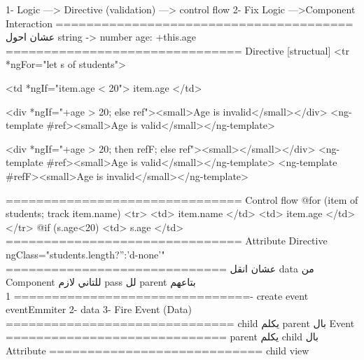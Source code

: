 1- Logic ---> Directive (validation) ---> control flow
2- Fix Logic --->Component Interaction
=======================================
عشان احول 
string -> number
age: +this.age
===============================
Directive [structual]
<tr *ngFor="let s of students">

<td *ngIf="item.age < 20">{{ item.age }}</td>

<div *ngIf="+age > 20; else ref"><small>Age is invalid</small></div>
<ng-template #ref><small>Age is valid</small></ng-template>

<div *ngIf="+age > 20; then refF; else ref"><small></small></div>
<ng-template #ref><small>Age is valid</small></ng-template>
<ng-template #refF><small>Age is invalid</small></ng-template>

===============================
Control flow
@for (item of students; track item.name) {
    <tr>
      <td>{{ item.name }}</td>
      <td>{{ item.age }}</td>
    </tr>
}
@if (s.age<20) {
    <td>{{ s.age }}</td>
}
===============================
Attribute Directive
ngClass="students.length?'':'d-none'"
=============================
عشان انقل 
data 
من 
Component 
للتاني لازم 
pass
لل
parent 
بتاعهم
===============================
1- create event eventEmmiter
2- data
3- Fire Event (Data)
==============================
child 
يكلم 
parent
بال 
Event
=============================
parent
يكلم
child
بال 
Attribute
============================
child view 